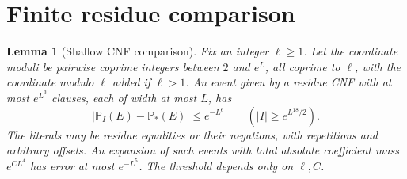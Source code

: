 \documentclass[11pt]{article}
\newtheorem{lemma}[theorem]{Lemma}
\theoremstyle{definition}
\newcommand{\Prob}{\mathbb P}
\theoremstyle{remark}
\numberwithin{equation}{section}
\begin{document}
\section{Finite residue comparison}\label{sec:comparison}

\begin{lemma}[Shallow CNF comparison]\label{lem:cnf}
Fix an integer $\ell\ge1$. Let the coordinate moduli be pairwise coprime integers between $2$ and $e^L$,
all coprime to $\ell$, with the coordinate modulo $\ell$ added if $\ell>1$.
An event given by a residue CNF with at most $e^{L^3}$ clauses, each of width at most $L$, has
\begin{equation}\label{eq:cnf-comparison}
 |\Prob_I(E)-\Prob_*(E)|\le e^{-L^6}\qquad(|I|\ge e^{L^{18}/2}).
\end{equation}
The literals may be residue equalities or their negations, with repetitions and arbitrary offsets.
An expansion of such events with total absolute coefficient mass $e^{CL^4}$ has error at most $e^{-L^5}$.
The threshold depends only on $\ell,C$.
\end{lemma}
\end{document}
